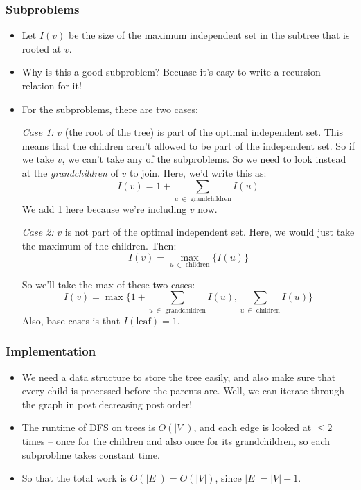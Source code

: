 \subsubsection{Subproblems}
\begin{itemize}
	\item Let \(I(v)\) be the size of the maximum independent set in the subtree that is rooted at \(v\). 
	\item Why is this a good subproblem? Becuase it's easy to write a recursion relation for it!
	\item For the subproblems, there are two cases:

		\textit{Case 1:} \(v\) (the root of the tree) is part of the optimal independent set. This 
		means that the children aren't allowed to be part of the independent set. So if we take $v$, we can't 
		take any of the subproblems. So we need to look instead at the \textit{grandchildren} of \(v\) to join.
		Here, we'd write this as:
		\[
			I(v) = 1 + \sum_{u\  \in \text{ grandchildren}} I(u)
		\] 
		We add 1 here because we're including \(v\) now. 

		\textit{Case 2:} \( v\) is not part of the optimal independent set. Here, we would just take 
		the maximum of the children. Then:
		\[
			I(v) = \max_{u \ \in \text{ children}} \{I(u)\} 
		\] 


		So we'll take the max of these two cases:
		\[
		I(v) = \max \{1 + \sum_{u \ \in \text{ grandchildren}} I(u), \sum_{u \ \in \text{ children}} I(u)\}
		\] 
		Also, base cases is that $I(\text{leaf}) = 1$. 
\end{itemize}
\subsubsection{Implementation}
\begin{itemize}
	\item We need a data structure to store the tree easily, and also make sure that every child is processed 
		before the parents are. Well, we can iterate through the graph in post decreasing post order! 
	\item The runtime of DFS on trees is \(O(|V|)\), and each edge is looked at \(\le 2\) times -- once 
		for the children and also once for its grandchildren, so each subproblme takes constant time. 
	\item So that the total work is \(O(|E|) = O(|V|)\), since \(|E| = |V| - 1\).
\end{itemize}
